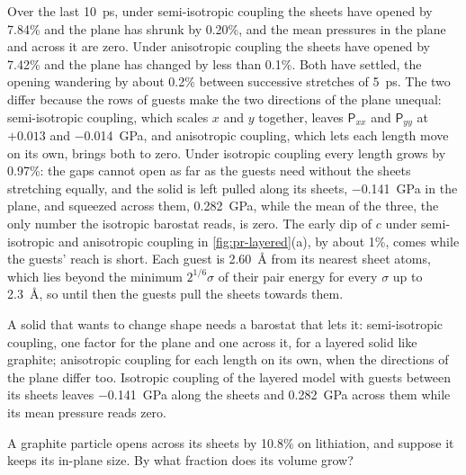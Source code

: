 Over the last \SI{10}{\pico\second}, under semi-isotropic coupling the
sheets have opened by 7.84\% and the plane has shrunk by 0.20\%, and the
mean pressures in the plane and across it are zero. Under anisotropic
coupling the sheets have opened by 7.42\% and the plane has changed by
less than 0.1\%. Both have settled, the opening wandering by about
0.2\% between successive stretches of \SI{5}{\pico\second}. The two differ
because the rows of guests make the two directions of the plane unequal:
semi-isotropic coupling, which scales $x$ and $y$ together, leaves
$\mathsf{P}_{xx}$ and $\mathsf{P}_{yy}$ at $+0.013$ and
\SI{-0.014}{\giga\pascal}, and anisotropic coupling, which lets each length
move on its own, brings both to zero. Under isotropic coupling every
length grows by 0.97\%: the gaps cannot open as far as the guests need
without the sheets stretching equally, and the solid is left pulled along
its sheets, \SI{-0.141}{\giga\pascal} in the plane, and squeezed across
them, \SI{+0.282}{\giga\pascal}, while the mean of the three, the only
number the isotropic barostat reads, is zero. The early dip of $c$ under
semi-isotropic and anisotropic coupling in \cref{fig:pr-layered}(a), by
about 1\%, comes while the guests' reach is short. Each guest is
\SI{2.60}{\angstrom} from its nearest sheet atoms, which lies beyond the
minimum $2^{1/6}\sigma$ of their pair energy for every $\sigma$ up to
\SI{2.3}{\angstrom}, so until then the guests pull the sheets towards
them.

\begin{keyidea}
A solid that wants to change shape needs a barostat that lets it:
semi-isotropic coupling, one factor for the plane and one across it, for
a layered solid like graphite; anisotropic coupling for each length on its
own, when the directions of the plane differ too. Isotropic coupling of
the layered model with guests between its sheets leaves
\SI{-0.141}{\giga\pascal} along the sheets and \SI{+0.282}{\giga\pascal}
across them while its mean pressure reads zero.
\end{keyidea}


\begin{selfcheck}
A graphite particle opens across its sheets by 10.8\% on lithiation, and
suppose it keeps its in-plane size. By what fraction does its volume grow?
\end{selfcheck}
